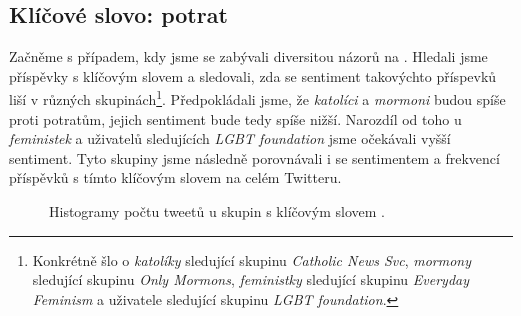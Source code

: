 \documentclass[12pt, a4paper]{article}
\numberwithin{equation}{section} 	%
\begin{document}
\subsection{Klíčové slovo: potrat}
\noindent Začněme s případem, kdy jsme se zabývali diversitou názorů na \textit{}. Hledali jsme příspěvky s klíčovým slovem \textit{} a sledovali, zda se sentiment takovýchto příspevků liší v různých skupinách\footnote{Konkrétně šlo o \textit{katolíky} sledující skupinu \textit{Catholic News Svc}, \textit{mormony} sledující skupinu \textit{Only Mormons}, \textit{feministky} sledující skupinu \textit{Everyday Feminism} a uživatele sledující skupinu \textit{LGBT foundation}.}. Předpokládali jsme, že \textit{katolíci} a \textit{mormoni} budou spíše proti potratům, jejich sentiment bude tedy spíše nižší. Narozdíl od toho u \textit{feministek} a uživatelů sledujících \textit{LGBT foundation} jsme očekávali vyšší sentiment. Tyto skupiny jsme následně porovnávali i se sentimentem a frekvencí příspěvků s tímto klíčovým slovem na celém Twitteru.
\begin{figure}[!h]
\centering
{}
\caption[]{Histogramy počtu tweetů u skupin s klíčovým slovem \textit{}.}
\label{fig:abortion1}
\end{figure}
\end{document}
